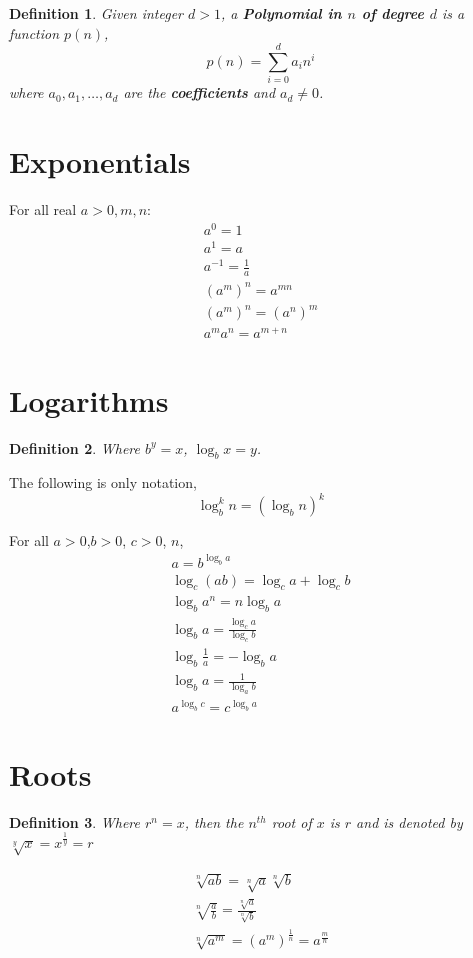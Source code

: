 \documentclass[]{tufte-handout}
\newtheorem{definition}{Definition}
\begin{document}
\begin{definition}
Given integer $d>1$, a \textbf{Polynomial in $n$ of degree $d$} is a function $p(n)$,
\begin{equation}
p(n) = \sum\limits_{i=0}^{d}a_in^i
\end{equation}
where $a_0,a_1,\ldots,a_d$ are the \textbf{coefficients} and $a_d \neq 0$.
\end{definition}


\section{Exponentials}

For all real $a > 0,m,n$:
\begin{eqnarray}
a^0 = 1 \\
a^1 = a \\
a^{-1} = \frac{1}{a} \\
(a^m)^n = a^{mn} \\
(a^m)^n = (a^n)^m \\
a^ma^n = a^{m+n}
\end{eqnarray}


\section{Logarithms}

\begin{definition}
Where $b^y = x$, $\log_b x = y$.
\end{definition}

The following is only notation,
\[ \log_b^k n = (\log_b n)^k \]

For all $a>0$,$b>0$, $c>0$, $n$,
\begin{eqnarray}
a = b^{\log_b a} \\
\log_c (ab) = \log_c a + \log_c b \\
\log_b a^n = n \log_b a \\
\log_b a = \frac{\log_c a}{\log_c b} \\
\log_b \frac{1}{a} = -\log_b a \\
\log_b a = \frac{1}{\log_a b} \\
a^{\log_b c} = c^{\log_b a}
\end{eqnarray}

\section{Roots}

\begin{definition}
Where $r^n= x$, then the $n^{th}$ root of $x$ is $r$ and is denoted by $\sqrt[y]{x} = x^{\frac{1}{y}} = r$
\end{definition}

\begin{eqnarray}
\sqrt[n]{ab} = \sqrt[n]{a}\sqrt[n]{b} \\
\sqrt[n]{\frac{a}{b}} = \frac{\sqrt[n]{a}}{\sqrt[n]{b}} \\
\sqrt[n]{a^m} = (a^m)^{\frac{1}{n}} = a^{\frac{m}{n}}
\end{eqnarray}
\end{document}
